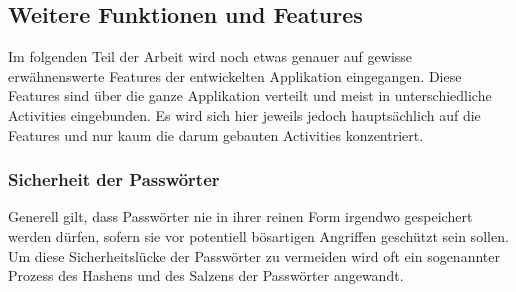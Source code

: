 \documentclass[a4paper,11pt]{report}
\begin{document}
		\subsection{Weitere Funktionen und Features}
		Im folgenden Teil der Arbeit wird noch etwas genauer auf gewisse erwähnenswerte Features der entwickelten Applikation eingegangen. Diese Features sind über die ganze Applikation verteilt und meist in unterschiedliche Activities eingebunden. Es wird sich hier jeweils jedoch hauptsächlich auf die Features und nur kaum die darum gebauten Activities konzentriert.
		
		\subsubsection{Sicherheit der Passwörter} \label{hash}
		Generell gilt, dass Passwörter nie in ihrer reinen Form irgendwo gespeichert werden dürfen, sofern sie vor potentiell bösartigen Angriffen geschützt sein sollen. Um diese Sicherheitslücke der Passwörter zu vermeiden wird oft ein sogenannter Prozess des Hashens und des Salzens der Passwörter angewandt. 
		
\end{document}
